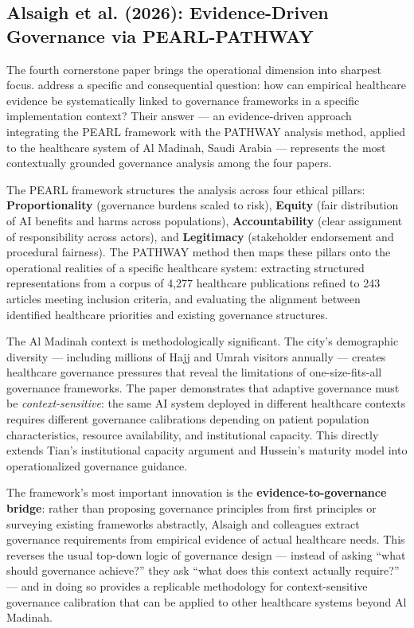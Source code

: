 \subsection{Alsaigh et al. (2026): Evidence-Driven Governance via PEARL-PATHWAY}
\label{sec:alsaigh}

The fourth cornerstone paper brings the operational dimension into sharpest
focus. \citet{alsaigh2026pearl} address a specific and consequential
question: how can empirical healthcare evidence be systematically linked to
governance frameworks in a specific implementation context? Their answer —
an evidence-driven approach integrating the PEARL framework with the PATHWAY
analysis method, applied to the healthcare system of Al Madinah, Saudi Arabia
— represents the most contextually grounded governance analysis among the
four papers.

The PEARL framework structures the analysis across four ethical pillars:
\textbf{Proportionality} (governance burdens scaled to risk), \textbf{Equity}
(fair distribution of AI benefits and harms across populations),
\textbf{Accountability} (clear assignment of responsibility across actors),
and \textbf{Legitimacy} (stakeholder endorsement and procedural fairness).
The PATHWAY method then maps these pillars onto the operational realities
of a specific healthcare system: extracting structured representations from
a corpus of 4,277 healthcare publications refined to 243 articles meeting
inclusion criteria, and evaluating the alignment between identified healthcare
priorities and existing governance structures.

The Al Madinah context is methodologically significant. The city's
demographic diversity — including millions of Hajj and Umrah visitors annually
— creates healthcare governance pressures that reveal the limitations of
one-size-fits-all governance frameworks. The paper demonstrates that
adaptive governance must be \textit{context-sensitive}: the same AI system
deployed in different healthcare contexts requires different governance
calibrations depending on patient population characteristics, resource
availability, and institutional capacity. This directly extends Tian's
institutional capacity argument and Hussein's maturity model into operationalized
governance guidance.

The framework's most important innovation is the \textbf{evidence-to-governance
bridge}: rather than proposing governance principles from first principles
or surveying existing frameworks abstractly, Alsaigh and colleagues extract
governance requirements from empirical evidence of actual healthcare needs.
This reverses the usual top-down logic of governance design — instead of
asking ``what should governance achieve?'' they ask ``what does this context
actually require?'' — and in doing so provides a replicable methodology for
context-sensitive governance calibration that can be applied to other
healthcare systems beyond Al Madinah.

